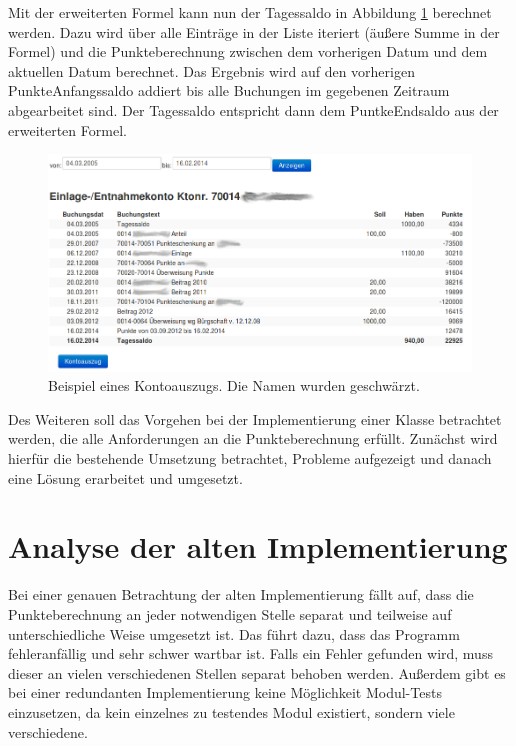 \documentclass[12pt]{scrreprt}
\begin{document}
Mit der erweiterten Formel kann nun der Tagessaldo in Abbildung \ref{account} berechnet werden. Dazu wird über alle Einträge in der Liste iteriert (äußere Summe in der Formel) und die Punkteberechnung zwischen dem vorherigen Datum und dem aktuellen Datum berechnet. Das Ergebnis wird auf den vorherigen PunkteAnfangssaldo addiert bis alle Buchungen im gegebenen Zeitraum abgearbeitet sind. Der Tagessaldo entspricht dann dem PuntkeEndsaldo aus der erweiterten Formel. \\

\begin{figure} 
  \includegraphics[width=\textwidth]{account-ano.png}
  \caption{Beispiel eines Kontoauszugs. Die Namen wurden geschwärzt.}
  \label{account}
\end{figure}

Des Weiteren soll das Vorgehen bei der Implementierung einer Klasse betrachtet werden, die alle Anforderungen an die Punkteberechnung erfüllt. Zunächst wird hierfür die bestehende Umsetzung betrachtet, Probleme aufgezeigt und danach eine Lösung erarbeitet und umgesetzt.

\newpage

\section{Analyse der alten Implementierung}
Bei einer genauen Betrachtung der alten Implementierung fällt auf, dass die Punkteberechnung an jeder notwendigen Stelle separat und teilweise auf unterschiedliche Weise umgesetzt ist. Das führt dazu, dass das Programm fehleranfällig und sehr schwer wartbar ist. Falls ein Fehler gefunden wird, muss dieser an vielen verschiedenen Stellen separat behoben werden. Außerdem gibt es bei einer redundanten Implementierung keine Möglichkeit Modul-Tests einzusetzen, da kein einzelnes zu testendes Modul existiert, sondern viele verschiedene. \\
\end{document}
